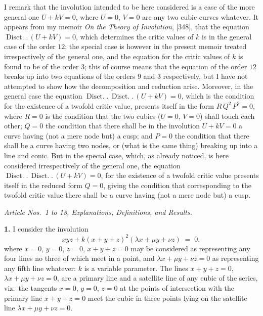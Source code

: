 \documentclass[11pt,a4paper]{article}
\providecommand{\Disct}{\operatorname{Disct.}}
\begin{document}
I remark that the involution intended to be here considered is a case of the more general one $U + kV = 0$, where $U = 0$, $V = 0$ are any two cubic curves whatever. It appears from my memoir \textit{On the Theory of Involution}, [348], that the equation $\Disct.\,(U + kV) = 0$, which determines the critic values of $k$ is in the general case of the order $12$; the special case is however in the present memoir treated irrespectively of the general one, and the equation for the critic values of $k$ is found to be of the order $3$; this of course means that the equation of the order $12$ breaks up into two equations of the orders $9$ and $3$ respectively, but I have not attempted to show how the decomposition and reduction arise. Moreover, in the general case the equation $\Disct.\,\Disct.\,(U + kV) = 0$, which is the condition for the existence of a twofold critic value, presents itself in the form $R\,Q^2\,P^2 = 0$, where $R = 0$ is the condition that the two cubics ($U = 0$, $V = 0$) shall touch each other; $Q = 0$ the condition that there shall be in the involution $U + kV = 0$ a curve having (not a mere node but) a cusp; and $P = 0$ the condition that there shall be a curve having two nodes, or (what is the same thing) breaking up into a line and conic. But in the special case, which, as already noticed, is here considered irrespectively of the general one, the equation $\Disct.\,\Disct.\,(U + kV) = 0$, for the existence of a twofold critic value presents itself in the reduced form $Q = 0$, giving the condition that corresponding to the twofold critic value there shall be a curve having (not a mere node but) a cusp.

\begin{center}
\textit{Article Nos.~1 to 18, Explanations, Definitions, and Results.}
\end{center}

\textbf{1.} I consider the involution
\[
xyz + k(x + y + z)^2(\lambda x + \mu y + \nu z) \;=\; 0,
\]
where $x = 0$, $y = 0$, $z = 0$, $x + y + z = 0$ may be considered as representing any four lines no three of which meet in a point, and $\lambda x + \mu y + \nu z = 0$ as representing any fifth line whatever: $k$ is a variable parameter. The lines $x + y + z = 0$, $\lambda x + \mu y + \nu z = 0$, are a primary line and a satellite line of any cubic of the series, viz.\ the tangents $x = 0$, $y = 0$, $z = 0$ at the points of intersection with the primary line $x + y + z = 0$ meet the cubic in three points lying on the satellite line $\lambda x + \mu y + \nu z = 0$.
\end{document}

